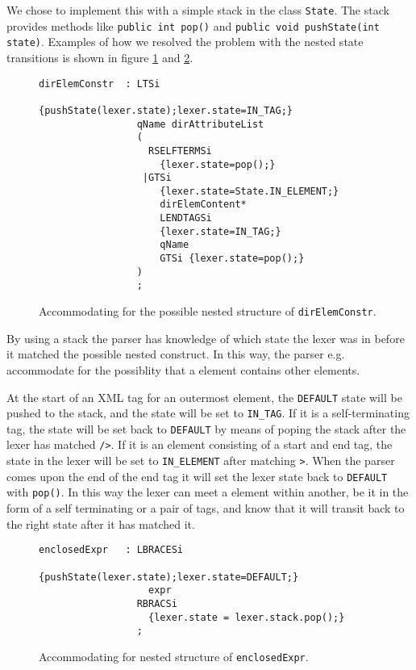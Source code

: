 We chose to implement this with a simple stack in the class \verb!State!. The stack provides methods like \verb!public int pop()! and \verb!public void pushState(int state)!. Examples of how we resolved the problem with the nested state transitions is shown in figure \ref{fig:nestedTransitionElement} and \ref{fig:nestedTransitionExpr}.

\begin{figure}[h!]
\begin{Verbatim}
dirElemConstr  : LTSi 
                  {pushState(lexer.state);lexer.state=IN_TAG;}
                 qName dirAttributeList
                 (
                   RSELFTERMSi
                     {lexer.state=pop();}
                  |GTSi 
                     {lexer.state=State.IN_ELEMENT;}
                     dirElemContent* 
                     LENDTAGSi 
                     {lexer.state=IN_TAG;}
                     qName 
                     GTSi {lexer.state=pop();}
                 )
                 ;
\end{Verbatim}
\caption[Accommodating for a nested structure of \texttt{dirElemConstr}]{Accommodating for the possible nested structure of \texttt{dirElemConstr}.}
\label{fig:nestedTransitionElement}
\end{figure}


By using a stack the parser has knowledge of which state the lexer was in before it matched the possible nested construct. In this way, the parser e.g. accommodate for the possiblity that a element contains other elements.

At the start of an XML tag for an outermost element, the \verb!DEFAULT! state will be pushed to the stack, and the state will be set to \verb!IN_TAG!. If it is a self-terminating tag, the state will be set back to \verb!DEFAULT! by means of poping the stack after the lexer has matched \verb!/>!. If it is an element consisting of a start and end tag, the state in the lexer will be set to \verb!IN_ELEMENT! after matching \verb!>!. When the parser comes upon the end of the end tag it will set the lexer state back to \verb!DEFAULT! with \verb!pop()!. In this way the lexer can meet a element within another, be it in the form of a self terminating or a pair of tags, and know that it will transit back to the right state after it has matched it.


\begin{figure}[h!]
\begin{Verbatim}
enclosedExpr   : LBRACESi 
                   {pushState(lexer.state);lexer.state=DEFAULT;}
                   expr 
                 RBRACSi 
                   {lexer.state = lexer.stack.pop();}
                 ;
\end{Verbatim}
\caption[Accommodating for nested structure of \texttt{enclosedExpr}]{Accommodating for nested structure of \texttt{enclosedExpr}.}
\label{fig:nestedTransitionExpr}
\end{figure}

